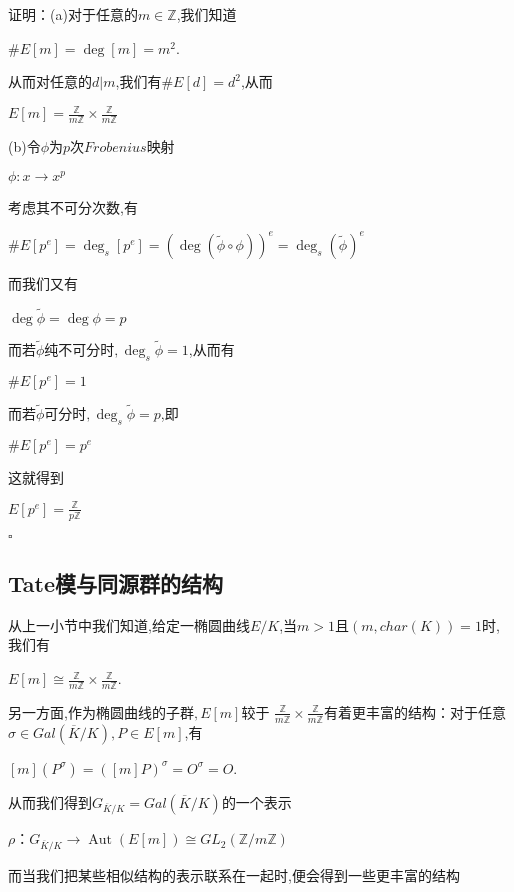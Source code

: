 \documentclass[11pt]{ctexart}
\DeclareMathOperator{\Deg}{deg}
\DeclareMathOperator{\Aut}{Aut}
\begin{document}
\noindent 证明：(a)对于任意的$m \in \mathbb{Z}$,我们知道
\begin{center}
    $\#E[m]=\Deg[m]=m^2$.
\end{center}
\noindent 从而对任意的$d|m$,我们有$\#E[d]=d^2$,从而
\begin{center}
$E[m]=\frac{\mathbb{Z}}{m\mathbb{Z}}\times \frac{\mathbb{Z}}{m\mathbb{Z}}$
\end{center}

\noindent (b)令$\phi$为$p$次$Frobenius$映射
\begin{center}
    $\phi:x\rightarrow x^p$
\end{center}
考虑其不可分次数,有
\begin{center}
    $\#E[p^e]=\Deg_s[p^e]=(\Deg(\widetilde{\phi}\circ \phi))^e=\Deg_s(\widetilde{\phi})^e$
\end{center}
\noindent 而我们又有
\begin{center}
    $\Deg\widetilde{\phi}=\Deg\phi=p$
\end{center}
\noindent 而若$\widetilde{\phi}$纯不可分时$,\Deg_s\widetilde{\phi}=1$,从而有
\begin{center}
    $\#E[p^e]=1$
\end{center}
\noindent 而若$\widetilde{\phi}$可分时$,\Deg_s\widetilde{\phi}=p$,即
\begin{center}
    $\#E[p^e]=p^e$
\end{center}
\noindent 这就得到
\begin{center}
    $E[p^e]=\frac{\mathbb{Z}}{p\mathbb{Z}}$
\end{center}

\hfill $\square$

\subsection{Tate模与同源群的结构\label{2.3}}

从上一小节中我们知道,给定一椭圆曲线$E/K$,当$m>1$且$(m,char(K))=1$时,我们有
\begin{center}
    $E[m]\cong \frac{\mathbb{Z}}{m\mathbb{Z}}\times \frac{\mathbb{Z}}{m\mathbb{Z}}$.
\end{center}
另一方面,作为椭圆曲线的子群$,E[m]$较于 $\frac{\mathbb{Z}}{m\mathbb{Z}}\times \frac{\mathbb{Z}}{m\mathbb{Z}}$有着更丰富的结构：对于任意$\sigma \in Gal(\overline{K}/K)$$,P \in E[m]$,有

\begin{center}
    $[m](P^{\sigma})=([m]P)^{\sigma}=O^{\sigma}=O$.
\end{center}
从而我们得到$G_{\overline{K}/K}=Gal(\overline{K}/K)$的一个表示
\begin{center}
    $\rho$：$G_{\overline{K}/K}\longrightarrow \Aut(E[m])\cong GL_2(\mathbb{Z}/m\mathbb{Z}) $
\end{center}
而当我们把某些相似结构的表示联系在一起时,便会得到一些更丰富的结构
\end{document}
